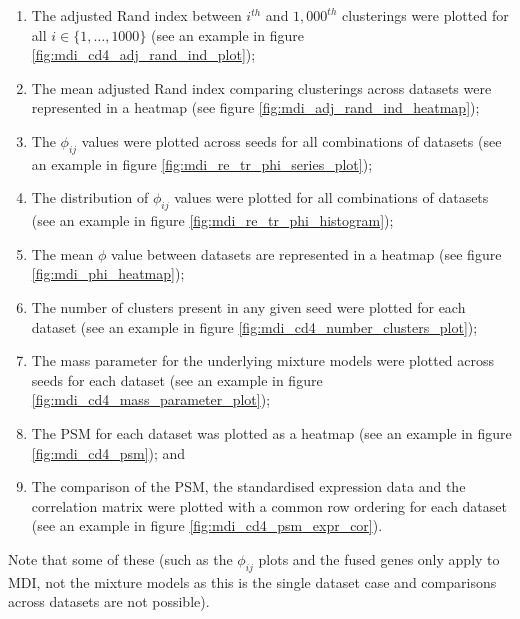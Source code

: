 \documentclass[12pt]{article} %
\begin{document}
	\begin{enumerate}
		\item The adjusted Rand index between $i^{th}$ and $1,000^{th}$ clusterings were plotted for all $i\in \{1,\ldots,1000\}$ (see an example in figure \ref{fig:mdi_cd4_adj_rand_ind_plot});
		\item The mean adjusted Rand index comparing clusterings across datasets were represented in a heatmap (see figure \ref{fig:mdi_adj_rand_ind_heatmap});
		\item The $\phi_{ij}$ values were plotted across seeds for all combinations of datasets (see an example in  figure \ref{fig:mdi_re_tr_phi_series_plot});
		\item The distribution of $\phi_{ij}$ values were plotted for all combinations of datasets (see an example in  figure \ref{fig:mdi_re_tr_phi_histogram});
		\item The mean $\phi$ value between datasets are represented in a heatmap (see figure \ref{fig:mdi_phi_heatmap});
		\item The number of clusters present in any given seed were plotted for each dataset (see an example in  figure \ref{fig:mdi_cd4_number_clusters_plot});
		\item The mass parameter for the underlying mixture models were plotted across seeds for each dataset (see an example in  figure \ref{fig:mdi_cd4_mass_parameter_plot});
		\item The PSM for each dataset was plotted as a heatmap (see an example in  figure \ref{fig:mdi_cd4_psm}); and
		\item The comparison of the PSM, the standardised expression data and the correlation matrix were plotted with a common row ordering for each dataset (see an example in  figure \ref{fig:mdi_cd4_psm_expr_cor}). %
	\end{enumerate}
	Note that some of these (such as the $\phi_{ij}$ plots and the fused genes only apply to MDI, not the mixture models as this is the single dataset case and comparisons across datasets are not possible).

	\newpage
	
\end{document}
